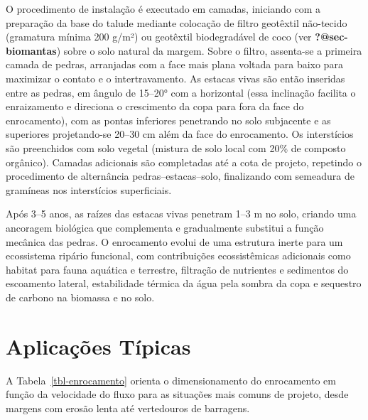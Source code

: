 \documentclass[
  portuguese,
  11pt,
  a4paper,
  open=any]{scrbook}
\begin{document}
O procedimento de instalação é executado em camadas, iniciando com a
preparação da base do talude mediante colocação de filtro geotêxtil
não-tecido (gramatura mínima 200 g/m²) ou geotêxtil biodegradável de
coco (ver \textbf{?@sec-biomantas}) sobre o solo natural da margem.
Sobre o filtro, assenta-se a primeira camada de pedras, arranjadas com a
face mais plana voltada para baixo para maximizar o contato e o
intertravamento. As estacas vivas são então inseridas entre as pedras,
em ângulo de 15--20° com a horizontal (essa inclinação facilita o
enraizamento e direciona o crescimento da copa para fora da face do
enrocamento), com as pontas inferiores penetrando no solo subjacente e
as superiores projetando-se 20--30 cm além da face do enrocamento. Os
interstícios são preenchidos com solo vegetal (mistura de solo local com
20\% de composto orgânico). Camadas adicionais são completadas até a
cota de projeto, repetindo o procedimento de alternância
pedras--estacas--solo, finalizando com semeadura de gramíneas nos
interstícios superficiais.

\begin{tcolorbox}[enhanced jigsaw, leftrule=.75mm, colframe=quarto-callout-tip-color-frame, colback=white, bottomrule=.15mm, opacityback=0, colbacktitle=quarto-callout-tip-color!10!white, breakable, bottomtitle=1mm, opacitybacktitle=0.6, title=\textcolor{quarto-callout-tip-color}{\faLightbulb}\hspace{0.5em}{Transição funcional}, titlerule=0mm, toprule=.15mm, toptitle=1mm, rightrule=.15mm, left=2mm, arc=.35mm, coltitle=black]

Após 3--5 anos, as raízes das estacas vivas penetram 1--3 m no solo,
criando uma ancoragem biológica que complementa e gradualmente substitui
a função mecânica das pedras. O enrocamento evolui de uma estrutura
inerte para um ecossistema ripário funcional, com contribuições
ecossistêmicas adicionais como habitat para fauna aquática e terrestre,
filtração de nutrientes e sedimentos do escoamento lateral, estabilidade
térmica da água pela sombra da copa e sequestro de carbono na biomassa e
no solo.

\end{tcolorbox}

\section{Aplicações Típicas}\label{aplicauxe7uxf5es-tuxedpicas}

A Tabela~\ref{tbl-enrocamento} orienta o dimensionamento do enrocamento
em função da velocidade do fluxo para as situações mais comuns de
projeto, desde margens com erosão lenta até vertedouros de barragens.
\end{document}
